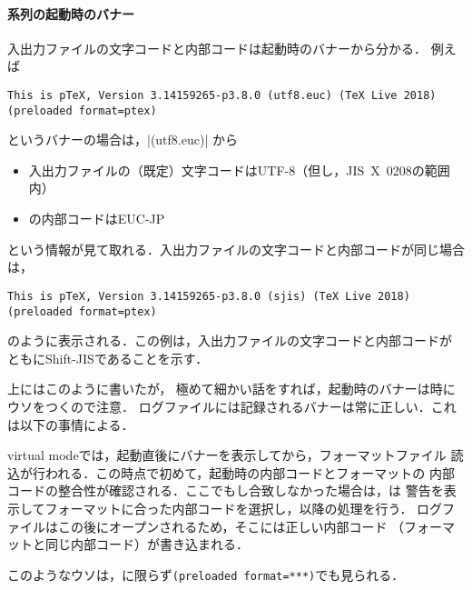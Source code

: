 \documentclass[a4paper,11pt,nomag,dvipdfmx]{jsarticle}
\def\code#1{\texttt{#1}}
\begin{document}
\paragraph{\pTeX 系列の起動時のバナー}
入出力ファイルの文字コードと内部コードは起動時のバナーから分かる．
例えば
\begin{verbatim}
This is pTeX, Version 3.14159265-p3.8.0 (utf8.euc) (TeX Live 2018)
(preloaded format=ptex)
\end{verbatim}
というバナーの場合は，|(utf8.euc)| から
\begin{itemize}
 \item 入出力ファイルの（既定）文字コードはUTF-8（但し，JIS~X~0208の範囲内）
 \item \pTeX の内部コードはEUC-JP
\end{itemize}
という情報が見て取れる．入出力ファイルの文字コードと内部コードが同じ場合は，
\begin{verbatim}
This is pTeX, Version 3.14159265-p3.8.0 (sjis) (TeX Live 2018)
(preloaded format=ptex)
\end{verbatim}
のように表示される．この例は，入出力ファイルの文字コードと内部コードが
ともにShift-JISであることを示す．

\begin{dangerous}
上にはこのように書いたが，
極めて細かい話をすれば，起動時のバナーは時にウソをつくので注意．
ログファイルには記録されるバナーは常に正しい．これは以下の事情による．

virtual modeでは，起動直後にバナーを表示してから，フォーマットファイル
読込が行われる．この時点で初めて，起動時の内部コードとフォーマットの
内部コードの整合性が確認される．ここでもし合致しなかった場合は，\pTeX は
警告を表示してフォーマットに合った内部コードを選択し，以降の処理を行う．
ログファイルはこの後にオープンされるため，そこには正しい内部コード
（フォーマットと同じ内部コード）が書き込まれる\cite{tjb55}．

このようなウソは，\pTeX に限らず\code{(preloaded format=***)}でも見られる．
\end{dangerous}
\end{document}
